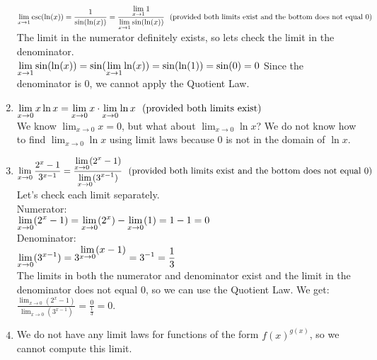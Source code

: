 \documentclass{ximera}
\begin{document}
\begin{question}
\begin{feedback}
\begin{enumerate}
   $\lim_{x\to 1}\csc(\ln(x)) \\
   = \frac{1}{\sin(\ln(x))}\\
   = \frac{\lim_{x\to 1}1}{\lim_{x\to 1}\sin(\ln(x))} \text{\ \ (provided both limits exist and the bottom does not equal 0)}$\\
   The limit in the numerator definitely exists, so lets check the limit in the denominator.\\
    $\lim_{x\to 1}\sin(\ln(x)) \\
    = \sin(\lim_{x\to 1}\ln(x))\\
    = \sin(\ln(1))\\
    = \sin(0) = 0\\$
   Since the denominator is 0, we cannot apply the Quotient Law.  
     
   \item $\lim_{x\to 0} x\ln x\\
   = \lim_{x\to 0} x \cdot \lim_{x\to 0}\ln x \text{\ \ (provided both limits exist)}$\\
   We know $\lim_{x\to 0} x = 0$, but what about $\lim_{x\to 0}\ln x$?
   We do not know how to find $\lim_{x\to 0}\ln x$ using limit laws because 0 is not in the domain of $\ln x$.
   
   \item $\lim_{x\to 0}\frac{2^x-1}{3^{x-1}} \\
   = \frac{\lim_{x\to 0}(2^x-1)}{\lim_{x\to 0}(3^{x-1})} \text{\ \ (provided both limits exist and the bottom does not equal 0)}$\\
   Let's check each limit separately.\\
   Numerator:\\
   $\lim_{x\to 0}(2^x-1)\\
   =\lim_{x\to 0}(2^x)-\lim_{x\to 0}(1)\\
   =1-1=0$\\
   Denominator:\\
   $\lim_{x\to 0}(3^{x-1})\\
   =3^{\lim_{x\to 0}(x-1)}\\
   =3^{-1}=\frac{1}{3}$\\
   The limits in both the numerator and denominator exist and the limit in the denominator does not equal 0, so we can use the Quotient Law.  We get:\\
   $\frac{\lim_{x\to 0}(2^x-1)}{\lim_{x\to 0}(3^{x-1})}
   =\frac{0}{\frac{1}{3}}=0$.
   


   
   \item We do not have any limit laws for functions of the form $f(x)^{g(x)}$, so we cannot compute this limit.
    \end{enumerate}
    \end{feedback} 
    
\end{question}
\end{document}
